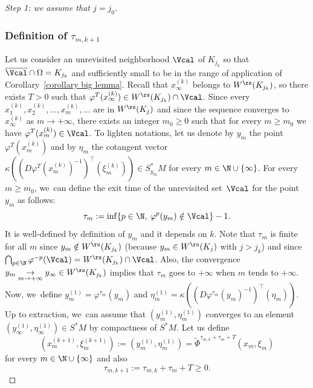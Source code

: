 \begin{proof}[Step 1: we assume that $j = j_0$]
\subsubsection*{Definition of $\tau_{m,k+1}$} Let us consider an unrevisited neighborhood $\Vcal$ of $K_{j_k}$ so that $\overline{\Vcal} \cap \Omega = K_{j_k}$ and sufficiently small to be in the range of application of Corollary~\ref{corollary big lemma}. Recall that $x_{\infty}^{(k)}$ belongs to $W^\rs (K_{j_k})$, so there exists $T > 0$ such that $\varphi^T (x_{\infty}^{(k)}) \in W^\rs (K_{j_k}) \cap \Vcal$. Since every $x_{1}^{(k)}, x_{2}^{(k)},\dots, x_{m}^{(k)},\dots$ are in $W^\rs (K_{j})$ and since the sequence converges to $x_{\infty}^{(k)}$ as $m \to + \infty$, there exists an integer $m_0 \geq 0$ such that for every $m \geq m_0$ we have $\varphi^T (x_m^{(k)}) \in \Vcal$.
To lighten notations, let us denote by $y_m$ the point $\varphi^T (x_{m}^{(k)})$ and by $\eta_m$ the cotangent vector $\kappa ((D \varphi^{T} (x_m^{(k)})^{-1})^{\top} (\xi_m^{(k)})) \in S_{y_m}^* M$ for every $m \in \N \cup \{ \infty \}$.
For every $m \geq m_0$, we~can define the exit time of the unrevisited set~$\Vcal$ for the point~$y_m$ as follows:
\[
\tau_m:= \inf \{ p \in \N, \: \varphi^p (y_m) \notin \Vcal \} -1.
\]
It is well-defined by definition of $y_m$ and it depends on $k$. Note that $\tau_m$ is finite for all $m$ since $y_m \notin W^\rs (K_{j_k})$ (because $y_m \in W^\rs (K_j)$ with $j > j_k$) and since $\bigcap_{p \in \N} \varphi^{-p} (\Vcal) = W^\rs (K_{j_k}) \cap \Vcal$. Also, the convergence $y_m \underset{m \to +\infty}{\to} y_{\infty} \in W^\rs (K_{j_k})$ implies that $\tau_m$ goes to $+\infty$ when $m$ tends to $+\infty$. Now, we~define $y_m^{(1)} = \varphi^{\tau_m} (y_m)$ and $\eta_m^{(1)} = \kappa ((D\varphi^{\tau_m} (y_m)^{-1})^{ \top} (\eta_m))$. Up to extraction, we~can assume that $(y_m^{(1)}, \eta_m^{(1)})$ converges to an element $(y_{\infty}^{(1)},\eta_{\infty}^{(1)}) \in S^*M$ by compactness of $S^* M$. Let us define
\[
(x_m^{(k+1)}, \xi_m^{(k+1)}):= (y_m^{(1)}, \eta_m^{(1)}) = \widetilde{\Phi}^{\tau_{m,k} + \tau_m + T} (x_m, \xi_m)
\]
for every $m \in \N \cup \{ \infty \}$ and also
\[
\tau_{m, k+ 1}:= \tau_{m,k} + \tau_m + T \geq 0.
\]

\end{proof}
